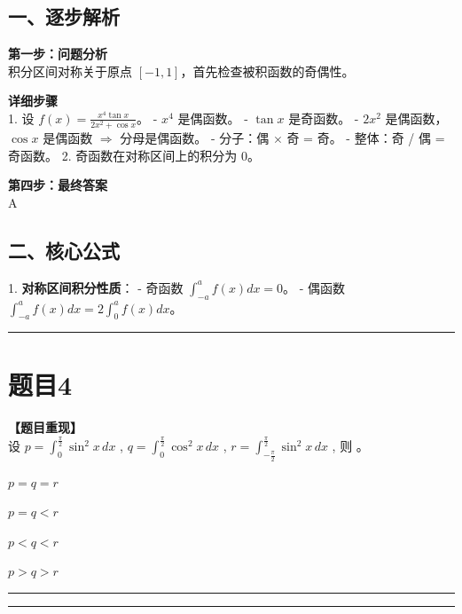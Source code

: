 \documentclass[12pt, a4paper]{ctexart}
\newcommand{\TopSeparator}{
    \par\noindent\rule{\textwidth}{1.5pt}\vspace{0.5em} %
}
\newcommand{\AnalysisSeparator}{
    \par\noindent\rule{\textwidth}{0.5pt}\vspace{0.2em}\hrule\vspace{0.5em} %
}
\newenvironment{RedAnalysis}{
    \par
    \color{red} %
}{
    \par
    \color{black} %
}
\newcommand{\choicesFour}[4]{
    \begin{enumerate}[label=\Alph*., itemsep=0pt, parsep=0pt, topsep=5pt, labelsep=0.5em]
        \begin{minipage}{0.22\linewidth} \item #1 \end{minipage}
        \begin{minipage}{0.22\linewidth} \item #2 \end{minipage}
        \begin{minipage}{0.22\linewidth} \item #3 \end{minipage}
        \begin{minipage}{0.22\linewidth} \item #4 \end{minipage}
    \end{enumerate}
}
\begin{document}
\begin{RedAnalysis}

\subsection*{一、逐步解析}

\textbf{第一步：问题分析} \\
积分区间对称关于原点 $[-1, 1]$，首先检查被积函数的奇偶性。

\textbf{详细步骤} \\
1. 设 $f(x) = \frac{x^4 \tan x}{2x^2 + \cos x}$。
   - $x^4$ 是偶函数。
   - $\tan x$ 是奇函数。
   - $2x^2$ 是偶函数，$\cos x$ 是偶函数 $\Rightarrow$ 分母是偶函数。
   - 分子：偶 $\times$ 奇 = 奇。
   - 整体：奇 / 偶 = 奇函数。
2. 奇函数在对称区间上的积分为 0。

\textbf{第四步：最终答案} \\
A

\subsection*{二、核心公式}
1. \textbf{对称区间积分性质}：
   - 奇函数 $\int_{-a}^a f(x) dx = 0$。
   - 偶函数 $\int_{-a}^a f(x) dx = 2\int_0^a f(x) dx$。

\end{RedAnalysis}

\vspace{2em}

\TopSeparator
\section*{题目4}

\textbf{【题目重现】} \\
设 $ p = \int_{0}^{\frac{\pi}{2}} \sin^{2}x \, dx $ , $ q = \int_{0}^{\frac{\pi}{2}} \cos^{2}x \, dx $ , $ r = \int_{-\frac{\pi}{2}}^{\frac{\pi}{2}} \sin^{2}x \, dx $ , 则 \underline{\hspace{1cm}}。
\choicesFour{$ p = q = r $}{$ p = q < r $}{$ p < q < r $}{$ p > q > r $}

\AnalysisSeparator
\end{document}
